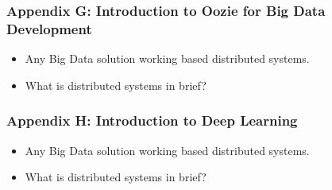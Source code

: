 

\begin{frame}
  \frametitle{Appendix G: Introduction to Oozie for Big Data Development}
	\begin{itemize}[<+->]
		\item Any Big Data solution working based distributed systems.
		\item What is distributed systems in brief?
	\end{itemize}
\end{frame}


\begin{frame}
  \frametitle{Appendix H: Introduction to Deep Learning}
	\begin{itemize}[<+->]
		\item Any Big Data solution working based distributed systems.
		\item What is distributed systems in brief?
	\end{itemize}
\end{frame}
